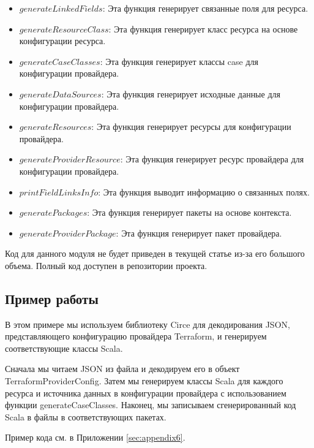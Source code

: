 \begin{itemize}
    \item $generateLinkedFields$: Эта функция генерирует связанные поля для
  ресурса.

    \item $generateResourceClass$: Эта функция генерирует класс ресурса на
основе
  конфигурации ресурса.

    \item $generateCaseClasses$: Эта функция генерирует классы case для
  конфигурации провайдера.

    \item $generateDataSources$: Эта функция генерирует исходные данные для
  конфигурации провайдера.

    \item $generateResources$: Эта функция генерирует ресурсы для конфигурации
  провайдера.

    \item $generateProviderResource$: Эта функция генерирует ресурс провайдера
для
  конфигурации провайдера.

    \item $printFieldLinksInfo$: Эта функция выводит информацию о связанных
полях.

    \item $generatePackages$: Эта функция генерирует пакеты на основе контекста.

    \item $generateProviderPackage$: Эта функция генерирует пакет провайдера.
  \end{itemize}


Код для данного модуля не будет приведен в текущей статье из-за его большого
объема. Полный код доступен в репозитории проекта.

\subsection{Пример работы}

В этом примере мы используем библиотеку Circe для декодирования JSON,
представляющего конфигурацию провайдера Terraform, и генерируем соответствующие
классы Scala.

Сначала мы читаем JSON из файла и декодируем его в объект
TerraformProviderConfig. Затем мы генерируем классы Scala для каждого ресурса и
источника данных в конфигурации провайдера с использованием функции
generateCaseClasses. Наконец, мы записываем сгенерированный код Scala в файлы в
соответствующих пакетах.

Пример кода см. в Приложении \ref{sec:appendix6}.

